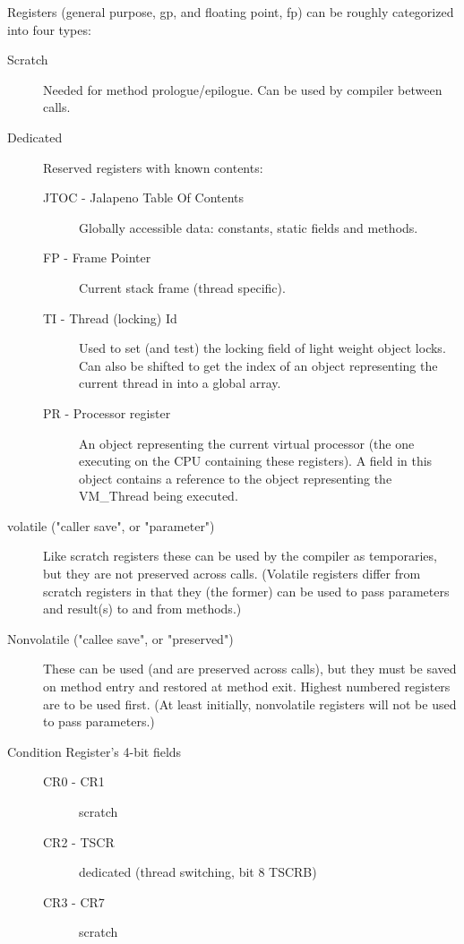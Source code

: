 
Registers (general purpose, gp, and floating point, fp) can be roughly
categorized into four types:

\begin{description}
\item [Scratch]
     Needed for method prologue/epilogue.  Can be used by compiler between
     calls.

\item[Dedicated]
     Reserved registers with known contents:
\begin{description}
\item [JTOC - Jalapeno Table Of Contents]
        Globally accessible data: constants, static fields and methods.

\item [FP - Frame Pointer]
        Current stack frame (thread specific).

\item [TI - Thread (locking) Id]
        Used to set (and test) the locking field of light weight object
        locks.  Can also be shifted to get the index of an object
        representing the current thread in into a global array.

\item [PR - Processor register]
        An object representing the current virtual processor (the one
        executing on the CPU containing these registers).  A field in
        this object contains a reference to the object representing
        the VM\_Thread being executed.
\end{description}

\item [volatile ("caller save", or "parameter")]
     Like scratch registers these can be used by the compiler as 
temporaries,
     but they are not preserved across calls.  (Volatile registers differ
     from scratch registers in that they (the former) can be used to pass
     parameters and result(s) to and from methods.)

\item [Nonvolatile ("callee save", or "preserved")]
     These can be used (and are preserved across calls), but they must be
     saved on method entry and restored at method exit.  Highest numbered
     registers are to be used first.  (At least initially, nonvolatile
     registers will not be used to pass parameters.)

\item[Condition Register's 4-bit fields]
\begin{description}
\item    [CR0 - CR1] scratch

\item    [CR2 - TSCR] dedicated (thread switching, bit 8 TSCRB)

\item    [CR3 - CR7] scratch
\end{description}
\end{description}


